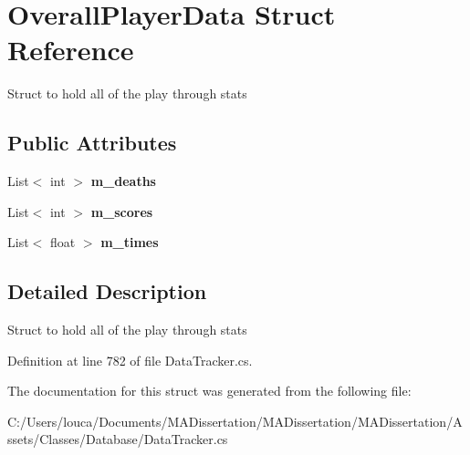 \hypertarget{struct_overall_player_data}{}\section{Overall\+Player\+Data Struct Reference}
\label{struct_overall_player_data}


Struct to hold all of the play through stats  


\subsection*{Public Attributes}
\begin{DoxyCompactItemize}
\item 
\mbox{\label{struct_overall_player_data_a1fd70c56847da7c64bdae2e5b4320467}} 
List$<$ int $>$ {\bfseries m\+\_\+deaths}
\item 
\mbox{\label{struct_overall_player_data_aef07934a01be560544a9c373cebe184f}} 
List$<$ int $>$ {\bfseries m\+\_\+scores}
\item 
\mbox{\label{struct_overall_player_data_a0f890bd5b749843068400cbb8b65cd15}} 
List$<$ float $>$ {\bfseries m\+\_\+times}
\end{DoxyCompactItemize}


\subsection{Detailed Description}
Struct to hold all of the play through stats 



Definition at line 782 of file Data\+Tracker.\+cs.



The documentation for this struct was generated from the following file\+:\begin{DoxyCompactItemize}
\item 
C\+:/\+Users/louca/\+Documents/\+M\+A\+Dissertation/\+M\+A\+Dissertation/\+M\+A\+Dissertation/\+Assets/\+Classes/\+Database/Data\+Tracker.\+cs\end{DoxyCompactItemize}
